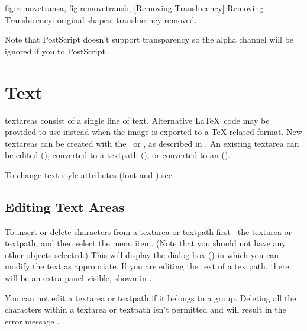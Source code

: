 {
 {fig:removetransa}{}{},
 {fig:removetransb}{}{},
}
[Removing Translucency]
{Removing Translucency:  original shapes;
   translucency removed.}

\begin{warning}
Note that PostScript doesn't support transparency so the
alpha channel will be ignored if you  to PostScript.
\end{warning}


\chapter{Text}\label{sec:text}

\Glspl{textarea} consist of a single line of text. Alternative
\LaTeX\ code may be provided to use instead when the image
is \hyperref[sec:exportimage]{exported} to a \TeX-related format.
New \glspl{textarea} can be created with the
\texttool\ or \mathstool, as described in .
An existing \gls{textarea} can be edited (),
converted to a \gls{textpath} (), or
converted to an  ().

To change text style attributes (font and ) see
.

\section{Editing Text Areas}\label{sec:edittext}


To insert or delete characters from a \gls{textarea} or \gls{textpath} first
\select\ the \gls*{textarea} or \gls*{textpath}, and then
select the  menu item.  (Note
that you should not have any other \glspl{object} selected.) This
will display the  dialog box
() in which you can modify the text as
appropriate. If you are editing the text of a \gls{textpath}, there
will be an extra panel visible, shown in
.

\begin{information}
You can not edit a \gls*{textarea} or \gls*{textpath} if
it belongs to a \gls{group}. Deleting all the characters within a
\gls*{textarea} or \gls*{textpath} isn't permitted and will result
in the error message .
\end{information}

